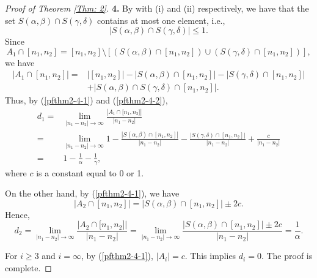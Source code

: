 \documentclass{amsart}
\theoremstyle{definition}
\numberwithin{equation}{section}%
\begin{document}
\begin{proof}[Proof of Theorem \ref{Thm: 2}]
\item[\bf 4.] By \cite[Theorems 6 and 8]{harman2015primes} with (i) and (ii) respectively, we have that the set $S(\alpha,\beta)\cap S(\gamma,\delta)$ contains at most one element, i.e.,
\begin{equation}\label{pfthm2-4-1}
    |S(\alpha,\beta)\cap S(\gamma,\delta)|\leq 1.
\end{equation}
Since
\begin{equation*}
     A_1\cap [n_{1},n_{2}]=[n_1, n_2]\setminus [(S(\alpha, \beta)\cap [n_1, n_2])\cup (S(\gamma, \delta)\cap [n_1, n_2])],
\end{equation*}
we have
\begin{equation}\label{pfthm2-4-2}
 \begin{aligned}
    |A_1\cap [n_{1},n_{2}]|=&|[n_{1},n_{2}]|-|S(\alpha, \beta)\cap [n_1, n_2]|-|S(\gamma, \delta)\cap [n_1, n_2]|\\
    &+|S(\alpha, \beta)\cap S(\gamma, \delta)\cap [n_1, n_2]|.
\end{aligned}   
\end{equation}
Thus, by (\ref{pfthm2-4-1}) and (\ref{pfthm2-4-2}),
\begin{align*}
d_1=&\lim_{\left\vert n_{1}-n_{2}\right\vert \rightarrow \infty }\frac{\left\vert A_1\cap \lbrack n_{1},n_{2}]\right\vert }{\left\vert
n_{1}-n_{2}\right\vert }\\
=&\lim_{\left\vert n_{1}-n_{2}\right\vert \rightarrow \infty }1-\frac{|S(\alpha, \beta)\cap [n_1, n_2]|}{|n_1-n_2|}-\frac{|S(\gamma, \delta)\cap [n_1, n_2]|}{|n_1-n_2|}+\frac{c}{|n_1-n_2|}\\
=&1-\frac{1}{\alpha}-\frac{1}{\gamma},
\end{align*}
where $c$ is a constant equal to 0 or 1.

On the other hand, by (\ref{pfthm2-4-1}), we have
\begin{equation*}
    |A_2\cap [n_1, n_2]|=|S(\alpha, \beta)\cap [n_1, n_2]|\pm 2c.
\end{equation*}
Hence,
\begin{equation*}
    d_2=\lim_{\left\vert n_{1}-n_{2}\right\vert \rightarrow \infty }\frac{\left\vert A_2\cap \lbrack n_{1},n_{2}]\right\vert }{\left\vert
n_{1}-n_{2}\right\vert }=\lim_{\left\vert n_{1}-n_{2}\right\vert \rightarrow \infty }\frac{|S(\alpha, \beta)\cap [n_1, n_2]|\pm 2c}{\left\vert
n_{1}-n_{2}\right\vert }=\frac{1}{\alpha}.
\end{equation*}

For $i\geq 3$ and $i=\infty$, by (\ref{pfthm2-4-1}), $|A_i|=c$. This implies $d_i=0$. The proof is complete.
\end{proof}
\end{document}
